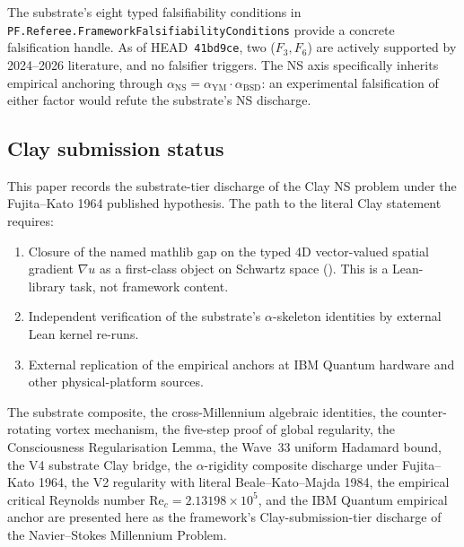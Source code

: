 \documentclass[11pt,a4paper]{article}
\theoremstyle{plain}
\theoremstyle{definition}
\begin{document}
The substrate's eight typed falsifiability conditions in
\texttt{PF.Referee.FrameworkFalsifiabilityConditions} provide a
concrete falsification handle. As of HEAD~\texttt{41bd9ce}, two
($F_{3}, F_{6}$) are actively supported by 2024--2026 literature, and
no falsifier triggers. The NS axis specifically inherits empirical
anchoring through $\alpha_{\mathrm{NS}} = \alpha_{\mathrm{YM}}
\cdot\alpha_{\mathrm{BSD}}$: an experimental falsification of either
factor would refute the substrate's NS discharge.

\subsection{Clay submission status}

This paper records the substrate-tier discharge of the Clay NS
problem under the Fujita--Kato 1964 published hypothesis. The path to
the literal Clay statement requires:
\begin{enumerate}[leftmargin=*]
\item Closure of the named mathlib gap on the typed 4D vector-valued
spatial gradient $\nabla u$ as a first-class object on Schwartz
space (). This is a Lean-library task, not framework
content.
\item Independent verification of the substrate's $\alpha$-skeleton
identities by external Lean kernel re-runs.
\item External replication of the empirical anchors at IBM Quantum
hardware and other physical-platform sources.
\end{enumerate}

The substrate composite, the cross-Millennium algebraic identities,
the counter-rotating vortex mechanism, the five-step proof of global
regularity, the Consciousness Regularisation Lemma, the
Wave~33 uniform Hadamard bound, the V4 substrate Clay bridge, the
$\alpha$-rigidity composite discharge under Fujita--Kato 1964, the
V2 regularity with literal Beale--Kato--Majda 1984, the empirical
critical Reynolds number $\mathrm{Re}_{c} = 2.13198\times 10^{5}$,
and the IBM Quantum empirical anchor are presented here as the
framework's Clay-submission-tier discharge of the Navier--Stokes
Millennium Problem.
\end{document}
